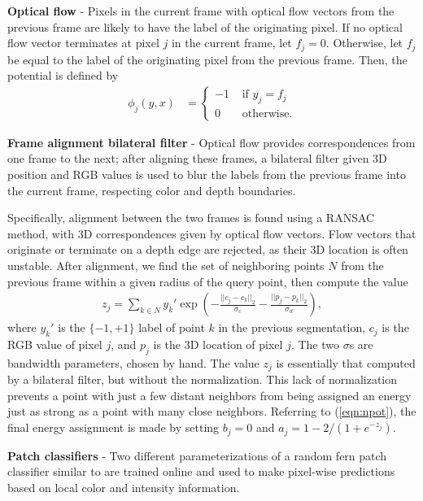 \documentclass[graybox]{svmult}
\begin{document}
\textbf{Optical flow} - Pixels in the current frame with optical flow vectors from the previous frame are likely to have the label of the originating pixel.  If no optical flow vector terminates at pixel $j$ in the current frame, let $f_j = 0$.  Otherwise, let $f_j$ be equal to the label of the originating pixel from the previous frame.  Then, the potential is defined by
\begin{align*}
  \phi_j(y, x) & =
  \left\{
  \begin{array}{rl}
    -1 & \mbox{ if } y_j = f_j \\
    0 & \mbox{ otherwise.}
  \end{array}
  \right.
\end{align*}

\textbf{Frame alignment bilateral filter} - Optical flow provides correspondences from one frame to the next; after aligning these frames, a bilateral filter given 3D position and RGB values is used to blur the labels from the previous frame into the current frame, respecting color and depth boundaries.

Specifically, alignment between the two frames is found using a RANSAC method, with 3D correspondences given by optical flow vectors.  Flow vectors that originate or terminate on a depth edge are rejected, as their 3D location is often unstable.  After alignment, we find the set of neighboring points $N$ from the previous frame within a given radius of the query point, then compute the value
\begin{align*}
  z_j = \sum_{k \in N} y_k' \exp \left(-\frac{||c_j - c_k||_2}{\sigma_c} - \frac{||p_j - p_k||_2}{\sigma_d} \right),
\end{align*}
where $y_k'$ is the $\{-1, +1\}$ label of point $k$ in the previous segmentation, $c_j$ is the RGB value of pixel $j$, and $p_j$ is the 3D location of pixel $j$. The two $\sigma$s are bandwidth parameters, chosen by hand.  The value $z_j$ is essentially that computed by a bilateral filter, but without the normalization.  This lack of normalization prevents a point with just a few distant neighbors from being assigned an energy just as strong as a point with many close neighbors. Referring to (\ref{eqn:npot}), the final energy assignment is made by setting $b_j = 0$ and $a_j = 1 - 2 / (1 + e^{-z_j})$.

\textbf{Patch classifiers} - Two different parameterizations of a random fern patch classifier similar to \cite{ozuysal2007a} are trained online and used to make pixel-wise predictions based on local color and intensity information.
\end{document}

